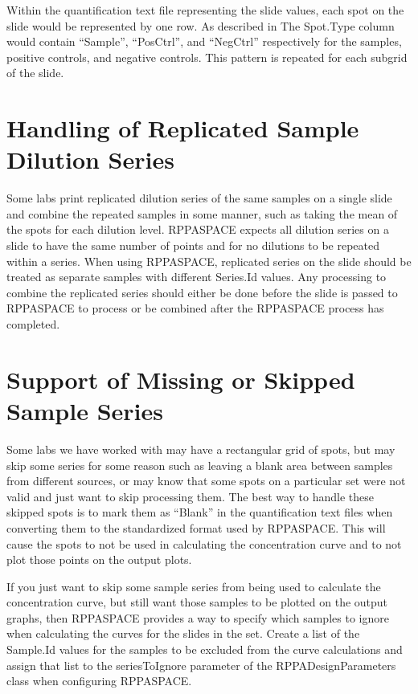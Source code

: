 \documentclass[
]{article}
\begin{document}
Within the quantification text file representing the slide values, each
spot on the slide would be represented by one row. As described in The
Spot.Type column would contain ``Sample'', ``PosCtrl'', and ``NegCtrl''
respectively for the samples, positive controls, and negative controls.
This pattern is repeated for each subgrid of the slide.

\hypertarget{replicated_series}{%
\section{Handling of Replicated Sample Dilution
Series}\label{replicated_series}}

Some labs print replicated dilution series of the same samples on a
single slide and combine the repeated samples in some manner, such as
taking the mean of the spots for each dilution level. RPPASPACE expects
all dilution series on a slide to have the same number of points and for
no dilutions to be repeated within a series. When using RPPASPACE,
replicated series on the slide should be treated as separate samples
with different Series.Id values. Any processing to combine the
replicated series should either be done before the slide is passed to
RPPASPACE to process or be combined after the RPPASPACE process has
completed.

\hypertarget{missing_series}{%
\section{Support of Missing or Skipped Sample
Series}\label{missing_series}}

Some labs we have worked with may have a rectangular grid of spots, but
may skip some series for some reason such as leaving a blank area
between samples from different sources, or may know that some spots on a
particular set were not valid and just want to skip processing them. The
best way to handle these skipped spots is to mark them as ``Blank'' in
the quantification text files when converting them to the standardized
format used by RPPASPACE. This will cause the spots to not be used in
calculating the concentration curve and to not plot those points on the
output plots.

If you just want to skip some sample series from being used to calculate
the concentration curve, but still want those samples to be plotted on
the output graphs, then RPPASPACE provides a way to specify which
samples to ignore when calculating the curves for the slides in the set.
Create a list of the Sample.Id values for the samples to be excluded
from the curve calculations and assign that list to the seriesToIgnore
parameter of the RPPADesignParameters class when configuring RPPASPACE.
\end{document}
